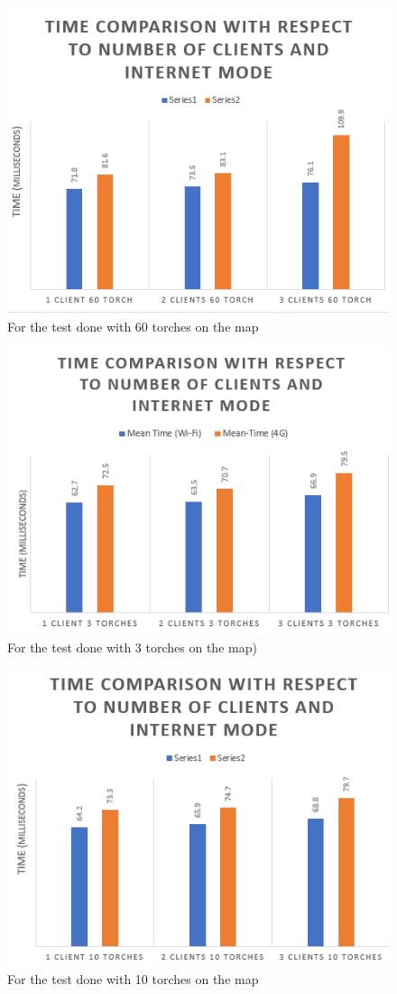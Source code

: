 \documentclass[12pt,a4paper,twoside]{report}
\begin{document}
\begin{thebibliography}{widestlabel}
 \begin{figure}[htps]
     \centering
     \includegraphics[width=0.5\linewidth]{tc1.png}
     \caption{For the test done with 60 torches on the map}
     \label{60torch}
 \end{figure}
 
 
 \begin{figure}[htps]
     \centering
     \includegraphics[width=0.5\linewidth]{tc2.png}
     \caption{For the test done with 3 torches on the map)}
     \label{3torch}
 \end{figure}
 
  \begin{figure}[htps]
     \centering
     \includegraphics[width=0.5\linewidth]{tc3.png}
     \caption{For the test done with 10 torches on the map}
     \label{10torch}
 \end{figure}
 

\end{thebibliography}
\end{document}
